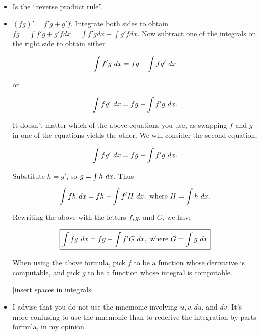 \begin{itemize}
    \item Is the ``reverse product rule''.
    \item $(fg)' = f'g + g'f$. Integrate both sides to obtain $fg = \int f'g + g'f dx = \int f'g dx + \int g'f dx$. Now subtract one of the integrals on the right side to obtain either
    
    \begin{align*}
        \int f'g \text{ } dx = fg - \int fg' \text{ } dx
    \end{align*}
    
    or
    
    \begin{align*}
        \int fg' \text{ } dx = fg - \int f'g \text{ } dx.
    \end{align*}
    
    It doesn't matter which of the above equations you use, as swapping $f$ and $g$ in one of the equations yields the other. We will consider the second equation,
    
    \begin{align*}
        \int fg' \text{ } dx = fg - \int f'g \text{ } dx.
    \end{align*}
    
    Substitute $h = g'$, so $g = \int h \text{ } dx$. Thus
    
    \begin{align*}
        \int fh \text{ } dx = fh - \int f'H \text{ } dx, \text{ where } H = \int h \text{ } dx.
    \end{align*}
    
    Rewriting the above with the letters $f, g$, and $G$, we have
    
    \begin{align*}
        \boxed
        {
            \int fg \text{ } dx = fg - \int f'G \text{ } dx, \text{ where } G = \int g \text{ } dx
        }
    \end{align*}
    
    When using the above formula, pick $f$ to be a function whose derivative is computable, and pick $g$ to be a function whose integral is computable.
    
    [insert spaces in integrals]
    
    
    \item I advise that you do not use the mnemonic involving $u, v, du$, and $dv$. It's more confusing to use the mnemonic than to rederive the integration by parts formula, in my opinion. 
\end{itemize}